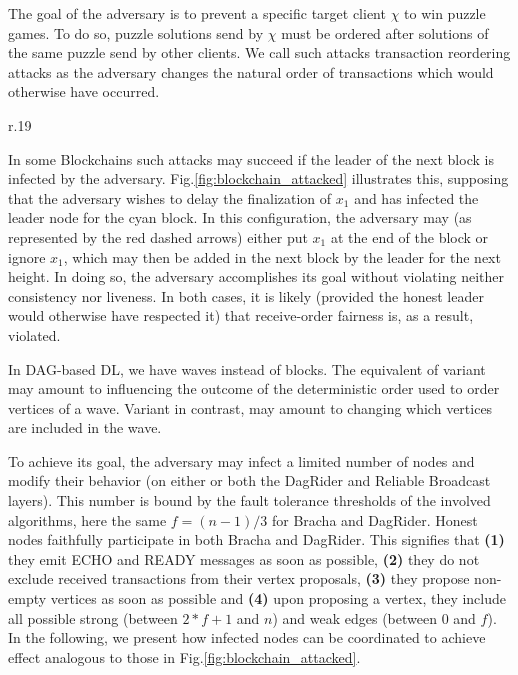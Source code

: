 


The goal of the adversary is to prevent a specific target client $\chi$ to win puzzle games.
To do so, puzzle solutions send by $\chi$ must be ordered after solutions of the same puzzle send by other clients.
We call such attacks transaction reordering attacks \cite{sok_preventing_transaction_reordering_manipulations_in_decentralized_finance} as the adversary changes the natural order of transactions which would otherwise have occurred.


\begin{wrapfigure}{r}{.19\textwidth}
    \centering
    \scalebox{.75}{}
    \caption{Desired effect on a Blockchain}
    \label{fig:blockchain_attacked}
\vspace*{-.5cm}
\end{wrapfigure}



In some Blockchains such attacks may succeed if the leader of the next block is infected by the adversary.
Fig.\ref{fig:blockchain_attacked} illustrates this, supposing that the adversary wishes to delay the finalization of $x_1$ and has infected the leader node for the cyan block.
In this configuration, the adversary may (as represented by the red dashed arrows) either  put $x_1$ at the end of the block or  ignore $x_1$, which may then be added in the next block by the leader for the next height.
In doing so, the adversary accomplishes its goal without violating neither consistency nor liveness.
In both cases, it is likely (provided the honest leader would otherwise have respected it) that receive-order fairness is, as a result, violated.


In DAG-based DL, we have waves instead of blocks.
The equivalent of variant  may amount to influencing the outcome of the deterministic order used to order vertices of a wave.
Variant  in contrast, may amount to changing which vertices are included in the wave.




To achieve its goal, the adversary may infect a limited number of nodes and modify their behavior (on either or both the DagRider and Reliable Broadcast layers). This number is bound by the fault tolerance thresholds of the involved algorithms, here the same $f = (n-1)/3$ for Bracha and DagRider.
Honest nodes faithfully participate in both Bracha and DagRider.
This signifies that \textbf{(1)} they emit ECHO and READY messages as soon as possible, \textbf{(2)} they do not exclude received transactions from their vertex proposals, \textbf{(3)} they propose non-empty vertices as soon as possible and \textbf{(4)} upon proposing a vertex, they include all possible strong (between $2*f+1$ and $n$) and weak edges (between $0$ and $f$).
In the following, we present how infected nodes can be coordinated to achieve effect analogous to those in Fig.\ref{fig:blockchain_attacked}.




